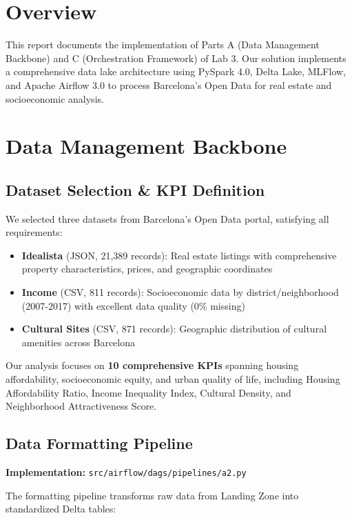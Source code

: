\section*{Overview}

This report documents the implementation of Parts A (Data Management Backbone) and C (Orchestration Framework) of Lab 3. Our solution implements a comprehensive data lake architecture using PySpark 4.0, Delta Lake, MLFlow, and Apache Airflow 3.0 to process Barcelona's Open Data for real estate and socioeconomic analysis.

\section{Data Management Backbone}

\subsection{Dataset Selection \& KPI Definition}

We selected three datasets from Barcelona's Open Data portal, satisfying all requirements:

\begin{itemize}[nosep]
\item \textbf{Idealista} (JSON, 21,389 records): Real estate listings with comprehensive property characteristics, prices, and geographic coordinates
\item \textbf{Income} (CSV, 811 records): Socioeconomic data by district/neighborhood (2007-2017) with excellent data quality (0\% missing)
\item \textbf{Cultural Sites} (CSV, 871 records): Geographic distribution of cultural amenities across Barcelona
\end{itemize}

Our analysis focuses on \textbf{10 comprehensive KPIs} spanning housing affordability, socioeconomic equity, and urban quality of life, including Housing Affordability Ratio, Income Inequality Index, Cultural Density, and Neighborhood Attractiveness Score.

\subsection{Data Formatting Pipeline}

\textbf{Implementation:} \texttt{src/airflow/dags/pipelines/a2.py}

The formatting pipeline transforms raw data from Landing Zone into standardized Delta tables:

